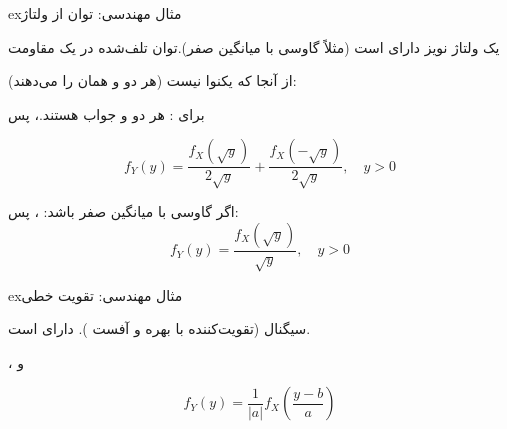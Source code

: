 \begin{PSbox}[unbreakable]{ex}{مثال مهندسی: توان از ولتاژ}

یک ولتاژ نویز  دارای  است (مثلاً گاوسی با میانگین صفر).\PSbr{}توان تلف‌شده در یک مقاومت 

از آنجا که  یکنوا نیست (هر دو  و  همان  را می‌دهند):

برای : هر دو  و  جواب هستند.\PSbr{}، پس 

\[f_Y(y) = \frac{f_X(\sqrt{y})}{2\sqrt{y}} + \frac{f_X(-\sqrt{y})}{2\sqrt{y}}, \quad y > 0\]

اگر  گاوسی با میانگین صفر باشد: ، پس:\PSbr{}\[f_Y(y) = \frac{f_X(\sqrt{y})}{\sqrt{y}}, \quad y > 0\]

\end{PSbox}

\begin{PSbox}[unbreakable]{ex}{مثال مهندسی: تقویت خطی}

سیگنال  (تقویت‌کننده با بهره  و آفست ).\PSbr{} دارای  است.

، و 

\[f_Y(y) = \frac{1}{|a|} f_X\left(\frac{y-b}{a}\right)\]

\end{PSbox}


